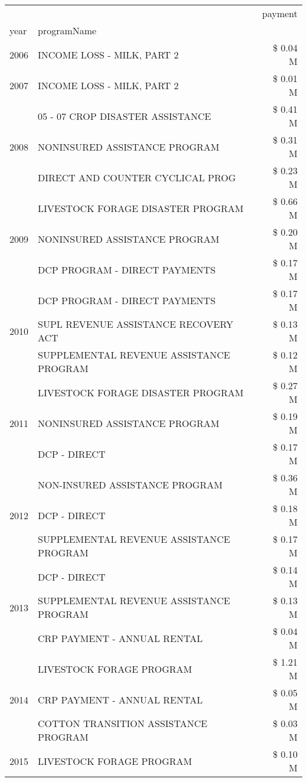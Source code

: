 \begin{tabular}{llr}
\toprule
 &  & payment \\
year & programName &  \\
\midrule
2006 & INCOME LOSS - MILK, PART 2 & \$ 0.04 M \\
\cline{1-3}
2007 & INCOME LOSS - MILK, PART 2 & \$ 0.01 M \\
\cline{1-3}
\multirow[t]{3}{*}{2008} & 05 - 07 CROP DISASTER ASSISTANCE & \$ 0.41 M \\
 & NONINSURED ASSISTANCE PROGRAM & \$ 0.31 M \\
 & DIRECT AND COUNTER CYCLICAL PROG & \$ 0.23 M \\
\cline{1-3}
\multirow[t]{3}{*}{2009} & LIVESTOCK FORAGE DISASTER  PROGRAM & \$ 0.66 M \\
 & NONINSURED ASSISTANCE PROGRAM & \$ 0.20 M \\
 & DCP PROGRAM - DIRECT PAYMENTS & \$ 0.17 M \\
\cline{1-3}
\multirow[t]{3}{*}{2010} & DCP PROGRAM - DIRECT PAYMENTS & \$ 0.17 M \\
 & SUPL REVENUE ASSISTANCE RECOVERY ACT & \$ 0.13 M \\
 & SUPPLEMENTAL REVENUE ASSISTANCE PROGRAM & \$ 0.12 M \\
\cline{1-3}
\multirow[t]{3}{*}{2011} & LIVESTOCK FORAGE DISASTER PROGRAM & \$ 0.27 M \\
 & NONINSURED ASSISTANCE PROGRAM & \$ 0.19 M \\
 & DCP - DIRECT & \$ 0.17 M \\
\cline{1-3}
\multirow[t]{3}{*}{2012} & NON-INSURED ASSISTANCE PROGRAM & \$ 0.36 M \\
 & DCP - DIRECT & \$ 0.18 M \\
 & SUPPLEMENTAL REVENUE ASSISTANCE PROGRAM & \$ 0.17 M \\
\cline{1-3}
\multirow[t]{3}{*}{2013} & DCP - DIRECT & \$ 0.14 M \\
 & SUPPLEMENTAL REVENUE ASSISTANCE PROGRAM & \$ 0.13 M \\
 & CRP PAYMENT - ANNUAL RENTAL & \$ 0.04 M \\
\cline{1-3}
\multirow[t]{3}{*}{2014} & LIVESTOCK FORAGE PROGRAM & \$ 1.21 M \\
 & CRP PAYMENT - ANNUAL RENTAL & \$ 0.05 M \\
 & COTTON TRANSITION ASSISTANCE PROGRAM & \$ 0.03 M \\
\cline{1-3}
\multirow[t]{3}{*}{2015} & LIVESTOCK FORAGE PROGRAM & \$ 0.10 M \\

\end{tabular}
